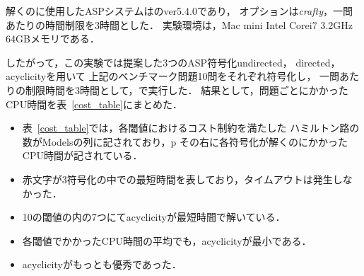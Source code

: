 解くのに使用したASPシステムは{\clingo}のver5.4.0であり，
オプションは\textit{crafty}，一問あたりの時間制限を3時間とした．
実験環境は，Mac mini Intel Corei7 3.2GHz 64GBメモリである．

したがって，この実験では提案した3つのASP符号化\textsf{undirected}，
\textsf{directed}，\textsf{acyclicity}を用いて
上記のベンチマーク問題10問をそれぞれ符号化し，
一問あたりの制限時間を3時間として，{\clingo}で実行した．
結果として，問題ごとにかかったCPU時間を表~\ref{cost_table}にまとめた．

\begin{itemize}
\item 表~\ref{cost_table}では，各閾値におけるコスト制約を満たした
  ハミルトン路の数がModelsの列に記されており，p
  その右に各符号化が解くのにかかったCPU時間が記されている．
\item 赤文字が3符号化の中での最短時間を表しており，タイムアウトは発生しなかった．
\item 10の閾値の内の7つにて\textsf{acyclicity}が最短時間で解いている．
\item 各閾値でかかったCPU時間の平均でも，\textsf{acyclicity}が最小である．
\item \textsf{acyclicity}がもっとも優秀であった．
\end{itemize}

